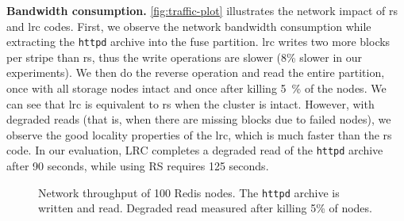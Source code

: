 \textbf{Bandwidth consumption.}
\label{subsec:network-traffic}
\autoref{fig:traffic-plot} illustrates the network impact of \ac{rs} and \ac{lrc} codes. 
First, we observe the network bandwidth consumption while extracting the \texttt{httpd} archive into the \ac{fuse} partition. 
\ac{lrc} writes two more blocks per stripe than \ac{rs}, thus the write operations are slower (8\% slower in our experiments). %
We then do the reverse operation and read the entire partition, once with all storage nodes intact and once after killing \SI{5}{\percent} of the nodes. 
We can see that \ac{lrc} is equivalent to \ac{rs} when the cluster is intact. 
However, with degraded reads (that is, when there are missing blocks due to failed nodes), we observe the good locality properties of the \ac{lrc}, which is much faster than the \ac{rs} code. In our evaluation, LRC completes a degraded read of the \texttt{httpd} archive after 90 seconds, while using RS requires 125 seconds.

\begin{figure*}
    \centering
    
    \caption{Network throughput of 100 Redis nodes. The \texttt{httpd} archive is written and read. Degraded read measured after killing 5\% of nodes.}
    \label{fig:traffic-plot}
\end{figure*}

